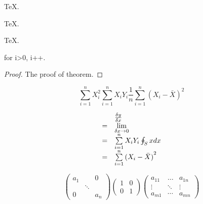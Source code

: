 \begin{Lemma}
	\TeX .
\end{Lemma}

\begin{Lemma}
	\TeX .
\end{Lemma}

\begin{Lemma}
	\TeX .
\end{Lemma}

\begin{Theorem}
	for i>0, i++.
\end{Theorem}

\begin{proof}
	The proof of theorem.
\end{proof}



\begin{equation}
	\sum\limits_{i = 1}^n {X_i^2} \sum\limits_{i = 1}^n {{X_i}{Y_i}} \frac{1}{n}\sum\limits_{i = 1}^n {{{({X_i} - \bar X)}^2}}
\end{equation}

\begin{equation}
	\begin{array}{lllll}
		           & \frac{{\delta y}}{{\delta x}}                   \\
		{\rm{ = }} & \mathop {\lim }\limits_{\delta x \to 0}         \\
		{\rm{ = }} & \sum\limits_{i = 1}^n {{X_i}{Y_i}} \oint_S x dx \\
		{\rm{ = }} & \sum\limits_{i = 1}^n {{{({X_i} - \bar X)}^2}}
	\end{array}
\end{equation}           %

\[\left( {\begin{array}{*{20}{c}}
			{{a_1}} & {}     & 0       \\
			{}      & \ddots & {}      \\
			0       & {}     & {{a_n}}
		\end{array}} \right)\left( {\begin{array}{*{20}{c}}
			1 & 0 \\
			0 & 1
		\end{array}} \right)\left( {\begin{array}{*{20}{c}}
			{{a_{11}}} & \ldots & {{a_{1n}}} \\
			\vdots     & \ddots & \vdots     \\
			{{a_{m1}}} & \cdots & {{a_{mn}}}
		\end{array}} \right)\]


